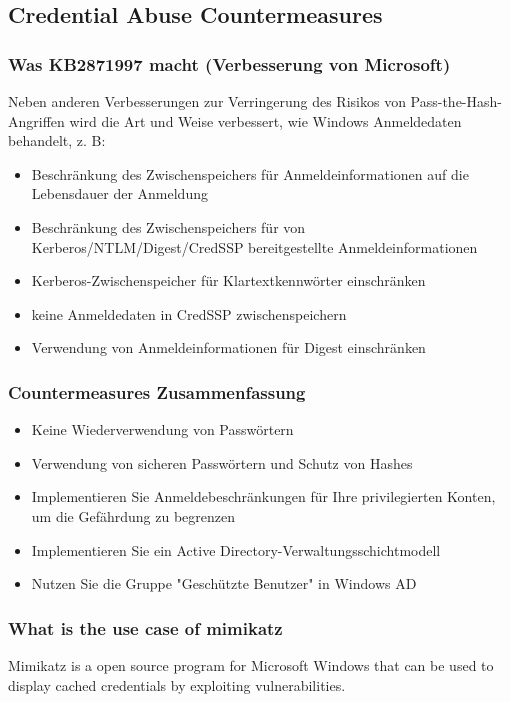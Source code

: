 \subsection{Credential Abuse Countermeasures}

\subsubsection{Was KB2871997 macht (Verbesserung von Microsoft)}
Neben anderen Verbesserungen zur Verringerung des Risikos von Pass-the-Hash-Angriffen wird die Art und Weise verbessert, wie Windows Anmeldedaten behandelt, z. B:
\begin{itemize}
    \item Beschränkung des Zwischenspeichers für Anmeldeinformationen auf die Lebensdauer der Anmeldung
    \item Beschränkung des Zwischenspeichers für von Kerberos/NTLM/Digest/CredSSP bereitgestellte Anmeldeinformationen
    \item Kerberos-Zwischenspeicher für Klartextkennwörter einschränken
    \item keine Anmeldedaten in CredSSP zwischenspeichern
    \item Verwendung von Anmeldeinformationen für Digest einschränken
\end{itemize}

\subsubsection{Countermeasures Zusammenfassung}
\begin{itemize}
    \item Keine Wiederverwendung von Passwörtern
    \item Verwendung von sicheren Passwörtern und Schutz von Hashes
    \item Implementieren Sie Anmeldebeschränkungen für Ihre privilegierten Konten, um die Gefährdung zu begrenzen
    \item Implementieren Sie ein Active Directory-Verwaltungsschichtmodell
    \item Nutzen Sie die Gruppe "Geschützte Benutzer" in Windows AD
\end{itemize}

\subsubsection{What is the use case of mimikatz}
Mimikatz is a open source program for Microsoft Windows that can be used to display cached credentials by exploiting vulnerabilities.

